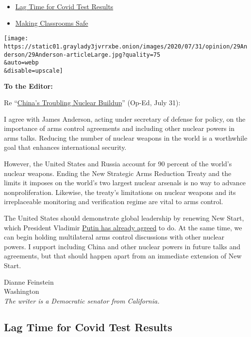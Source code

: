 \begin{itemize}
\tightlist
\item
  \protect\hyperlink{link-8b8bdd5}{Lag Time for Covid Test Results}
\item
  \protect\hyperlink{link-7c46b27b}{Making Classrooms Safe}
\end{itemize}

\texttt{[image: https://static01.graylady3jvrrxbe.onion/images/2020/07/31/opinion/29Anderson/29Anderson-articleLarge.jpg?quality=75\\\&auto=webp\\\&disable=upscale]}

\textbf{To the Editor:}

Re
``\href{https://www.nytimes3xbfgragh.onion/2020/07/29/opinion/russia-china-nuclear-weapons.html}{China's
Troubling Nuclear Buildup}'' (Op-Ed, July 31):

I agree with James Anderson, acting under secretary of defense for
policy, on the importance of arms control agreements and including other
nuclear powers in arms talks. Reducing the number of nuclear weapons in
the world is a worthwhile goal that enhances international security.

However, the United States and Russia account for 90 percent of the
world's nuclear weapons. Ending the New Strategic Arms Reduction Treaty
and the limits it imposes on the world's two largest nuclear arsenals is
no way to advance nonproliferation. Likewise, the treaty's limitations
on nuclear weapons and its irreplaceable monitoring and verification
regime are vital to arms control.

The United States should demonstrate global leadership by renewing New
Start, which President Vladimir
\href{https://www.armscontrol.org/blog/2019-12-19/us-russian-nuclear-arms-control}{Putin
has already agreed} to do. At the same time, we can begin holding
multilateral arms control discussions with other nuclear powers. I
support including China and other nuclear powers in future talks and
agreements, but that should happen apart from an immediate extension of
New Start.

Dianne Feinstein\\
Washington\\
\emph{The writer is a Democratic senator from California.}

\hypertarget{lag-time-for-covid-test-results}{%
\subsection{Lag Time for Covid Test
Results}\label{lag-time-for-covid-test-results}}

